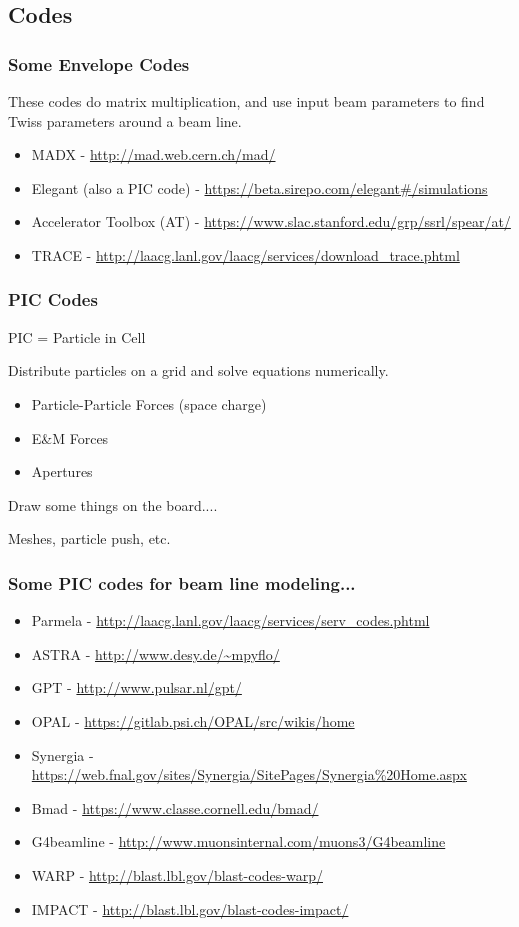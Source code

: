 \documentclass[professionalfonts,t]{beamer}
\begin{document}
\subsection{Codes}
\begin{frame}
	\frametitle{Some Envelope Codes}
	These codes do matrix multiplication, and use input beam parameters to find Twiss parameters around a beam line.
	
	\vspace{1em}
	\begin{itemize}
		\item MADX - \url{http://mad.web.cern.ch/mad/}
		\item Elegant (also a PIC code) - \url{https://beta.sirepo.com/elegant\#/simulations}
		\item Accelerator Toolbox (AT) - \url{https://www.slac.stanford.edu/grp/ssrl/spear/at/}
		\item TRACE - \url{http://laacg.lanl.gov/laacg/services/download_trace.phtml}
	\end{itemize}
\end{frame}


\begin{frame}
	\frametitle{PIC Codes}
	PIC = Particle in Cell 
	\vspace{1em}
	
	Distribute particles on a grid and solve equations numerically.
	\begin{itemize}
		\item Particle-Particle Forces (space charge)
		\item E\&M Forces
		\item Apertures 
	\end{itemize}
	
	\vspace{1em}
	Draw some things on the board....
	
	Meshes, particle push, etc.
\end{frame}

\begin{frame}
	\frametitle{Some PIC codes for beam line modeling...}
	\vspace{-1em}
	\small
	\begin{itemize}
		\item Parmela - \url{http://laacg.lanl.gov/laacg/services/serv_codes.phtml} 
		\item ASTRA - \url{http://www.desy.de/~mpyflo/}
		\item GPT - \url{http://www.pulsar.nl/gpt/}
		\item OPAL - \url{https://gitlab.psi.ch/OPAL/src/wikis/home}
		\item Synergia -  \url{https://web.fnal.gov/sites/Synergia/SitePages/Synergia\%20Home.aspx}
		\item Bmad - \url{https://www.classe.cornell.edu/bmad/}
		\item G4beamline - \url{http://www.muonsinternal.com/muons3/G4beamline}
		\item WARP - \url{http://blast.lbl.gov/blast-codes-warp/}
		\item IMPACT - \url{http://blast.lbl.gov/blast-codes-impact/}
	\end{itemize}
\end{frame}
\end{document}
